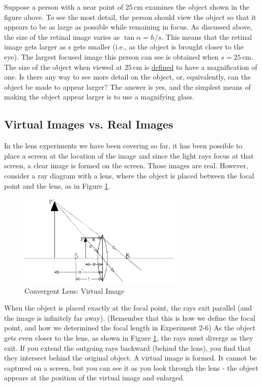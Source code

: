 Suppose a person with a near point of $25\, \textrm{cm}$ examines the object shown in the figure above. To see the most detail, the person should view the object so that it appears to be as large as possible while remaining in focus. As discussed above, the size of the retinal image varies as $\tan\alpha=h/s$. This means that the retinal image gets larger as s gets smaller (i.e., as the object is brought closer to the eye). The largest focused image this person can see is obtained when $s = 25\, \textrm{cm}$. The size of the object when viewed at $25\, \textrm{cm}$ is \underline{defined} to have a magnification of one. Is there any way to see more detail on the object, or, equivalently, can the object be made to appear larger? The answer is yes, and the simplest means of making the object appear larger is to use a magnifying glass.

\subsection{Virtual Images vs. Real Images}
\label{sec:vimages}

In the lens experiments we have been covering so far, it has been possible to place a screen at the location of the image and since the light rays focus at that screen, a clear image is formed on the screen. Those images are real. However, consider a ray diagram with a lens, where the object is placed between the focal point and the lens, as in Figure \ref{fig:virtualimage}.

\begin{figure}[h]
\centering
\includegraphics[width=0.7\textwidth]{./Exp7/pic/image5.png}
\caption{Convergent Lens: Virtual Image}
\label{fig:virtualimage}
\end{figure}

When the object is placed exactly at the focal point, the rays exit parallel (and the image is infinitely far away). (Remember that this is how we define the focal point, and how we determined the focal length in Experiment 2-6)  As the object gets even closer to the lens, as shown in Figure \ref{fig:virtualimage}, the rays must diverge as they exit. If you extend the outgoing rays backward (behind the lens), you find that they intersect behind the original object. A virtual image is formed. It cannot be captured on a screen, but you can see it as you look through the lens - the object appears at the position of the virtual image and enlarged.

